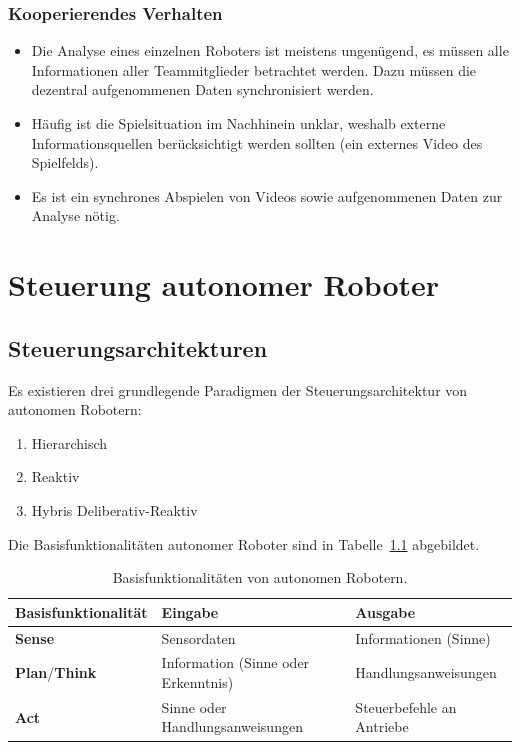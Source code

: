 		\subsection{Kooperierendes Verhalten}
			\begin{itemize}
				\item Die Analyse eines einzelnen Roboters ist meistens ungenügend, es müssen alle Informationen aller Teammitglieder betrachtet werden. Dazu müssen die dezentral aufgenommenen Daten synchronisiert werden.
				\item Häufig ist die Spielsituation im Nachhinein unklar, weshalb externe Informationsquellen berücksichtigt werden sollten (\zB ein externes Video des Spielfelds).
				\item Es ist ein synchrones Abspielen von Videos sowie aufgenommenen Daten zur Analyse nötig.
			\end{itemize}

\chapter{Steuerung autonomer Roboter}
	\section{Steuerungsarchitekturen}
		Es existieren drei grundlegende Paradigmen der Steuerungsarchitektur von autonomen Robotern:
		\begin{enumerate}
			\item Hierarchisch
			\item Reaktiv
			\item Hybris Deliberativ-Reaktiv
		\end{enumerate}
		Die Basisfunktionalitäten autonomer Roboter sind in Tabelle~\ref{tab:basicfunctionalitiesofautonomous_robots} abgebildet.
		
		\begin{table}
			\centering
			\begin{tabular}{l|ll}
				\textbf{Basisfunktionalität} & \textbf{Eingabe}                    & \textbf{Ausgabe}          \\ \hline
				\textbf{Sense}               & Sensordaten                         & Informationen (Sinne)     \\
				\textbf{Plan}/\textbf{Think} & Information (Sinne oder Erkenntnis) & Handlungsanweisungen      \\
				\textbf{Act}                 & Sinne oder Handlungsanweisungen     & Steuerbefehle an Antriebe
			\end{tabular}
			\caption{Basisfunktionalitäten von autonomen Robotern.}
			\label{tab:basicfunctionalitiesofautonomous_robots}
		\end{table}

